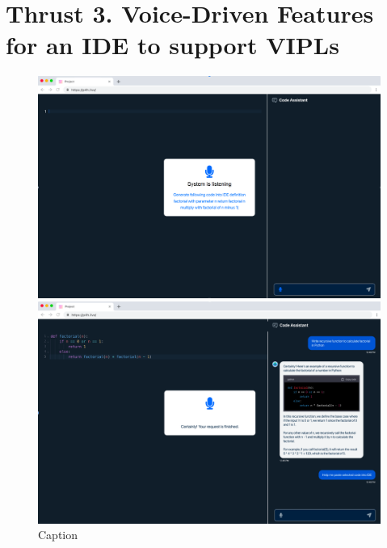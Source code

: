 \section{Thrust 3. Voice-Driven Features for an IDE to support VIPLs}
\label{sec:thrust3}

\begin{figure}[t]
\centering
\begin{minipage}{.48\textwidth}
\centering
\includegraphics[width=.98\textwidth]{p4h-1}
\end{minipage}
\begin{minipage}{.48\textwidth}
\centering
\includegraphics[width=.98\textwidth]{p4h-2}
\end{minipage}  
\vspace{-18pt}
\caption{Caption}
\label{thrust3-one}
\end{figure}

